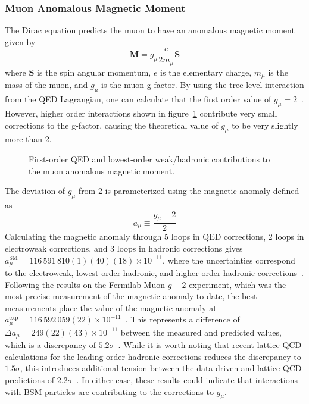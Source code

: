 \subsubsection{Muon Anomalous Magnetic Moment} \label{sec:gminus2}
The Dirac equation predicts the muon to have an anomalous magnetic moment given by
\begin{equation}
	\mathbf{M}=g_\mu\frac{e}{2m_\mu}\mathbf{S}
\end{equation}
where $\mathbf{S}$ is the spin angular momentum, $e$ is the elementary charge, $m_\mu$ is the mass of the muon, and $g_\mu$ is the muon g-factor. By using the tree level interaction from the QED Lagrangian, one can calculate that the first order value of $g_\mu=2$~\cite{gminus2_slides}. However, higher order interactions shown in figure~\ref{fig:muon_magnetic_moment} contribute very small corrections to the g-factor, causing the theoretical value of $g_\mu$ to be very slightly more than 2.
\begin{figure}[htb!]
	\begingroup
	
	
	
	\endgroup
	\caption[First-order QED and lowest-order weak/hadronic contributions to the muon anomalous magnetic moment.]{First-order QED and lowest-order weak/hadronic contributions to the muon anomalous magnetic moment.}
	\label{fig:muon_magnetic_moment}
\end{figure}
The deviation of $g_\mu$ from 2 is parameterized using the magnetic anomaly defined as
\begin{equation}
	a_\mu\equiv\frac{g_\mu-2}{2}
\end{equation}
Calculating the magnetic anomaly through 5 loops in QED corrections, 2 loops in electroweak corrections, and 3 loops in hadronic corrections gives $a_\mu^\text{SM}=116\,591\,810(1)(40)(18)\times10^{-11}$, where the uncertainties correspond to the electroweak, lowest-order hadronic, and higher-order hadronic corrections~\cite{pdg2024}. Following the results on the Fermilab Muon $g-2$ experiment, which was the most precise measurement of the magnetic anomaly to date, the best measurements place the value of the magnetic anomaly at $a_\mu^\text{exp}=116\,592\,059(22)\times10^{-11}$~\cite{gminus2}. This represents a difference of $\Delta a_\mu=249(22)(43)\times10^{-11}$ between the measured and predicted values, which is a discrepancy of $5.2\sigma$~\cite{pdg2024}. While it is worth noting that recent lattice QCD calculations for the leading-order hadronic corrections reduces the discrepancy to $1.5\sigma$, this introduces additional tension between the data-driven and lattice QCD predictions of $2.2\sigma$~\cite{gminus2_latticeqcd}. In either case, these results could indicate that interactions with BSM particles are contributing to the corrections to $g_\mu$.

